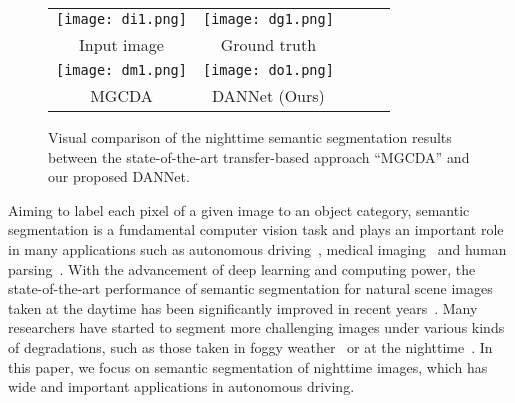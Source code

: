 \documentclass[final]{cvpr}
\begin{document}
\begin{figure}[htbp]
	\begin{center}
		\begin{tabular}{ccccc}
			\hspace{-.11cm}\texttt{[image: di1.png]} & \hspace{-.5cm}
			\texttt{[image: dg1.png]}\vspace{-0.1cm} \\
			\hspace{-.11cm} \small Input image & \hspace{-.5cm} \small Ground truth\\
			\hspace{-.11cm}\texttt{[image: dm1.png]} & \hspace{-.4cm}
			\texttt{[image: do1.png]} \vspace{-0.1cm}\\
			\hspace{-.11cm} \small MGCDA & \hspace{-.5cm} \small DANNet (Ours)\\
		\end{tabular}
		\vspace{-4pt}
		\caption{Visual comparison of the nighttime semantic segmentation results between the state-of-the-art transfer-based approach ``MGCDA'' \cite{sakaridis2020map} and our proposed DANNet.}
		\label{introduction}
		\vspace{-15pt}
	\end{center}
\end{figure}

Aiming to label each pixel of a given image to an object category, semantic segmentation is a fundamental computer vision task and plays an important role in many applications such as autonomous driving~\cite{geigerwe}, medical imaging~\cite{chen2019learning} and human parsing~\cite{zhang2020part}. 
With the advancement of deep learning and computing power, the state-of-the-art performance of semantic segmentation for natural scene images taken at the daytime has been significantly  improved in recent years~\cite{fu2019dual,huang2019ccnet}. 
Many researchers have started to segment more challenging images under various kinds of degradations, such as those taken in foggy weather~\cite{sakaridis2018semantic} or at the nighttime~\cite{sakaridis2019guided}.
In this paper, we focus on semantic segmentation of nighttime images, which has wide and important applications in autonomous driving.
\end{document}
